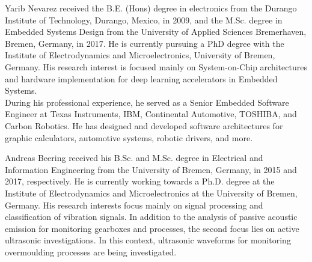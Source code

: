 \begin{IEEEbiography}{Yarib Nevarez} received the B.E. (Hons) degree in electronics from the Durango Institute of Technology, Durango, Mexico, in 2009, and the M.Sc. degree in Embedded Systems Design from the University of Applied Sciences Bremerhaven, Bremen, Germany, in 2017. He is currently pursuing a PhD degree with the Institute of Electrodynamics and Microelectronics, University of Bremen, Germany. His research interest is focused mainly on System-on-Chip architectures and hardware implementation for deep learning accelerators in Embedded Systems.
\\
During his professional experience, he served as a Senior Embedded Software Engineer at Texas Instruments, IBM, Continental Automotive, TOSHIBA, and Carbon Robotics. He has designed and developed software architectures for graphic calculators, automotive systems, robotic drivers, and more.
	
\end{IEEEbiography}

\begin{IEEEbiography}{Andreas Beering} received his B.Sc. and M.Sc. degree in Electrical and Information Engineering  from the University of Bremen, Germany, in 2015 and 2017, respectively. He is currently working towards a Ph.D. degree at the Institute of Electrodynamics and Microelectronics at the University of Bremen, Germany. His research interests focus mainly on signal processing and classification of vibration signals. In addition to the analysis of passive acoustic emission for monitoring gearboxes and processes, the second focus lies on active ultrasonic investigations.
In this context, ultrasonic waveforms for monitoring overmoulding processes are being investigated.
\end{IEEEbiography}

